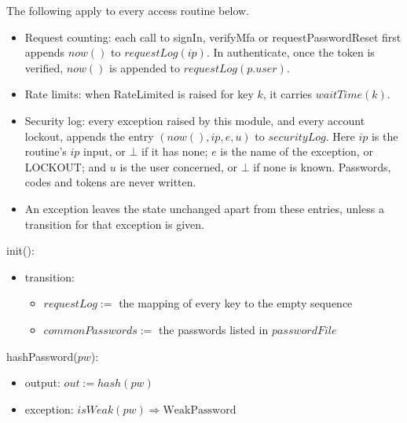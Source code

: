 \documentclass[12pt, titlepage]{article}
\begin{document}
\noindent The following apply to every access routine below.
\begin{itemize}
\item Request counting: each call to signIn, verifyMfa or
  requestPasswordReset first appends $\mathit{now}()$ to
  $\mathit{requestLog}(\mathit{ip})$. In authenticate, once the token is
  verified, $\mathit{now}()$ is appended to
  $\mathit{requestLog}(p.\mathit{user})$.
\item Rate limits: when RateLimited is raised for key $k$, it carries
  $\mathit{waitTime}(k)$.
\item Security log: every exception raised by this module, and every account
  lockout, appends the entry $(\mathit{now}(), \mathit{ip}, e, u)$ to
  $\mathit{securityLog}$. Here $\mathit{ip}$ is the routine's $\mathit{ip}$
  input, or $\bot$ if it has none; $e$ is the name of the exception, or
  LOCKOUT; and $u$ is the user concerned, or $\bot$ if none is known.
  Passwords, codes and tokens are never written.
\item An exception leaves the state unchanged apart from these entries,
  unless a transition for that exception is given.
\end{itemize}

\medskip

\noindent init():
\begin{itemize}
\item transition:
  \begin{itemize}
  \item $\mathit{requestLog} :=$ the mapping of every key to the empty
    sequence
  \item $\mathit{commonPasswords} :=$ the passwords listed in
    $\mathit{passwordFile}$
  \end{itemize}
\end{itemize}

\noindent hashPassword($\mathit{pw}$):
\begin{itemize}
\item output: $\mathit{out} := \mathit{hash}(\mathit{pw})$
\item exception: $\mathit{isWeak}(\mathit{pw}) \Rightarrow
  \mathrm{WeakPassword}$
\end{itemize}
\end{document}
